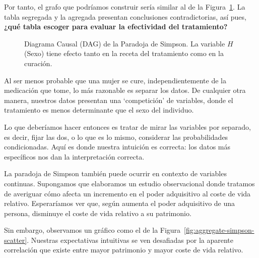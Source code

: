\documentclass[a4paper,11pt,spanish, twoside]{tfg-uam-matematicas_25-26}
\theoremstyle{definition}
\begin{document}
Por tanto, el grafo que podríamos construir sería similar al de la Figura~\ref{fig:simpson-dag}. La tabla segregada y la agregada presentan conclusiones contradictorias, así pues, \textbf{¿qué tabla escoger para evaluar la efectividad del tratamiento?}

\begin{figure}[ht]
    \centering
{}
    \caption{Diagrama Causal (DAG) de la Paradoja de Simpson. La variable $H$ (Sexo) tiene efecto tanto en la receta del tratamiento como en la curación.}
    \label{fig:simpson-dag}
\end{figure}

Al ser menos probable que una mujer se cure, independientemente de la medicación que tome, lo más razonable es separar los datos. De cualquier otra manera, nuestros datos presentan una `competición' de variables, donde el tratamiento es menos determinante que el sexo del individuo.

Lo que deberíamos hacer entonces es tratar de mirar las variables por separado, es decir, fijar las dos, o lo que es lo mismo, considerar las probabilidades condicionadas. Aquí es donde nuestra intuición es correcta: los datos más específicos nos dan la interpretación correcta.

La paradoja de Simpson también puede ocurrir en contexto de variables continuas. Supongamos que elaboramos un estudio observacional donde tratamos de averiguar cómo afecta un incremento en el poder adquisitivo al coste de vida relativo. Esperaríamos ver que, según aumenta el poder adquisitivo de una persona, disminuye el coste de vida relativo a su patrimonio.

Sin embargo, observamos un gráfico como el de la Figura~\ref{fig:aggregate-simpson-scatter}. Nuestras expectativas intuitivas se ven desafiadas por la aparente correlación que existe entre mayor patrimonio y mayor coste de vida relativo.
\end{document}

